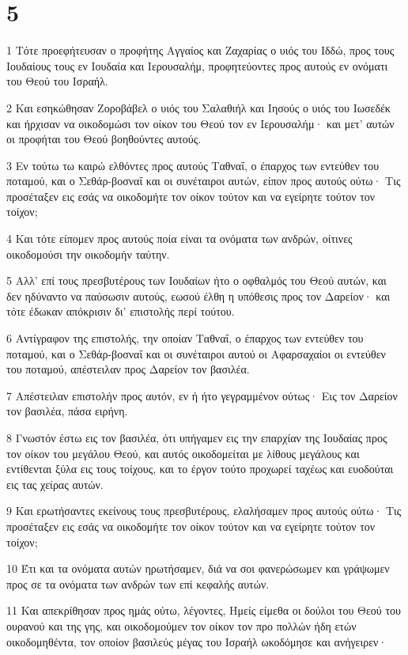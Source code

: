 \chapter{5}

\par 1 Τότε προεφήτευσαν ο προφήτης Αγγαίος και Ζαχαρίας ο υιός του Ιδδώ, προς τους Ιουδαίους τους εν Ιουδαία και Ιερουσαλήμ, προφητεύοντες προς αυτούς εν ονόματι του Θεού του Ισραήλ.
\par 2 Και εσηκώθησαν Ζοροβάβελ ο υιός του Σαλαθιήλ και Ιησούς ο υιός του Ιωσεδέκ και ήρχισαν να οικοδομώσι τον οίκον του Θεού τον εν Ιερουσαλήμ· και μετ' αυτών οι προφήται του Θεού βοηθούντες αυτούς.
\par 3 Εν τούτω τω καιρώ ελθόντες προς αυτούς Ταθναΐ, ο έπαρχος των εντεύθεν του ποταμού, και ο Σεθάρ-βοσναΐ και οι συνέταιροι αυτών, είπον προς αυτούς ούτω· Τις προσέταξεν εις εσάς να οικοδομήτε τον οίκον τούτον και να εγείρητε τούτον τον τοίχον;
\par 4 Και τότε είπομεν προς αυτούς ποία είναι τα ονόματα των ανδρών, οίτινες οικοδομούσι την οικοδομήν ταύτην.
\par 5 Αλλ' επί τους πρεσβυτέρους των Ιουδαίων ήτο ο οφθαλμός του Θεού αυτών, και δεν ηδύναντο να παύσωσιν αυτούς, εωσού έλθη η υπόθεσις προς τον Δαρείον· και τότε έδωκαν απόκρισιν δι' επιστολής περί τούτου.
\par 6 Αντίγραφον της επιστολής, την οποίαν Ταθναΐ, ο έπαρχος των εντεύθεν του ποταμού, και ο Σεθάρ-βοσναΐ και οι συνέταιροι αυτού οι Αφαρσαχαίοι οι εντεύθεν του ποταμού, απέστειλαν προς Δαρείον τον βασιλέα.
\par 7 Απέστειλαν επιστολήν προς αυτόν, εν ή ήτο γεγραμμένον ούτως· Εις τον Δαρείον τον βασιλέα, πάσα ειρήνη.
\par 8 Γνωστόν έστω εις τον βασιλέα, ότι υπήγαμεν εις την επαρχίαν της Ιουδαίας προς τον οίκον του μεγάλου Θεού, και αυτός οικοδομείται με λίθους μεγάλους και εντίθενται ξύλα εις τους τοίχους, και το έργον τούτο προχωρεί ταχέως και ευοδούται εις τας χείρας αυτών.
\par 9 Και ερωτήσαντες εκείνους τους πρεσβυτέρους, ελαλήσαμεν προς αυτούς ούτω· Τις προσέταξεν εις εσάς να οικοδομήτε τον οίκον τούτον και να εγείρητε τούτον τον τοίχον;
\par 10 Έτι και τα ονόματα αυτών ηρωτήσαμεν, διά να σοι φανερώσωμεν και γράψωμεν προς σε τα ονόματα των ανδρών των επί κεφαλής αυτών.
\par 11 Και απεκρίθησαν προς ημάς ούτω, λέγοντες, Ημείς είμεθα οι δούλοι του Θεού του ουρανού και της γης, και οικοδομούμεν τον οίκον τον προ πολλών ήδη ετών οικοδομηθέντα, τον οποίον βασιλεύς μέγας του Ισραήλ ωκοδόμησε και ανήγειρεν·
